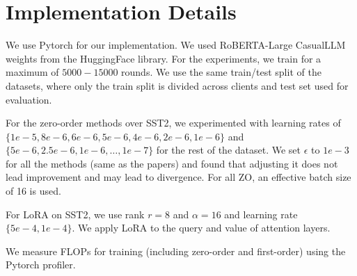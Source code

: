 \appendix
\section{Implementation Details}
\label{appendix:implementain_details}

We use Pytorch for our implementation. We used RoBERTA-Large CasualLLM weights from the HuggingFace library. For the experiments, we train for a maximum of $5000-15000$ rounds. We use the same train/test split of the datasets, where only the train split is divided across clients and test set used for evaluation.    


For the zero-order methods over SST2, we experimented with learning rates of $\{1e-5, 8e-6, 6e-6, 5e-6, 4e-6, 2e-6, 1e-6\}$ and $\{5e-6, 2.5e-6, 1e-6, \dots, 1e-7\}$ for the rest of the dataset. We set $\epsilon$ to $1e-3$ for all the methods (same as the papers) and found that adjusting it does not lead improvement and may lead to divergence. For all \ac{ZO}, an effective batch size of 16 is used.

For LoRA on SST2, we use rank $r=8$ and $\alpha = 16$ and learning rate $\{5e-4,1e-4\}$. We apply LoRA to the query and value of attention layers. 

We measure \acp{FLOP} for training (including zero-order and first-order) using the Pytorch profiler. 
